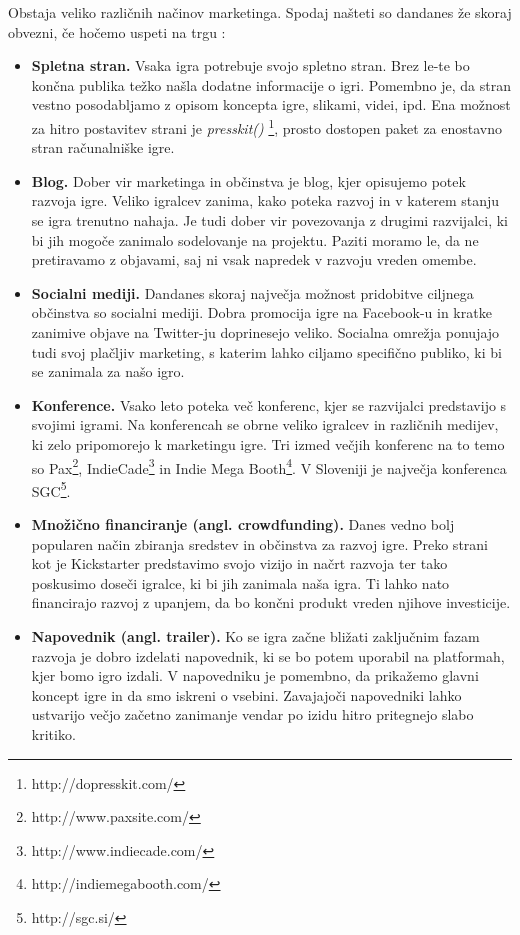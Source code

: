 \documentclass[12pt,a4paper,twoside]{book}
\begin{document}
Obstaja veliko različnih načinov marketinga. Spodaj našteti so dandanes že skoraj obvezni, če hočemo uspeti na trgu \cite{robertMarketing}:
\begin{itemize}
	\item \textbf{Spletna stran.} Vsaka igra potrebuje svojo spletno stran. Brez le-te bo končna publika težko našla dodatne informacije o igri. Pomembno je, da stran vestno posodabljamo z opisom koncepta igre, slikami, videi, ipd. Ena možnost za hitro postavitev strani je \textit{presskit()} \footnote{http://dopresskit.com/}, prosto dostopen paket za enostavno stran računalniške igre.
	\item \textbf{Blog.} Dober vir marketinga in občinstva je blog, kjer opisujemo potek razvoja igre. Veliko igralcev zanima, kako poteka razvoj in v katerem stanju se igra trenutno nahaja. Je tudi dober vir povezovanja z drugimi razvijalci, ki bi jih mogoče zanimalo sodelovanje na projektu. Paziti moramo le, da ne pretiravamo z objavami, saj ni vsak napredek v razvoju vreden omembe.
	\item \textbf{Socialni mediji.} Dandanes skoraj največja možnost pridobitve ciljnega občinstva so socialni mediji. Dobra promocija igre na Facebook-u in kratke zanimive objave na Twitter-ju doprinesejo veliko. Socialna omrežja ponujajo tudi svoj plačljiv marketing, s katerim lahko ciljamo specifično publiko, ki bi se zanimala za našo igro.
	\item \textbf{Konference.} Vsako leto poteka več konferenc, kjer se razvijalci predstavijo s svojimi igrami. Na konferencah	se obrne veliko igralcev in različnih medijev, ki zelo pripomorejo k marketingu igre. Tri izmed večjih konferenc na to temo so Pax\footnote{http://www.paxsite.com/}, IndieCade\footnote{http://www.indiecade.com/} in Indie Mega Booth\footnote{http://indiemegabooth.com/}. V Sloveniji je največja konferenca SGC\footnote{http://sgc.si/}.
	\item \textbf{Množično financiranje (angl. crowdfunding).} Danes vedno bolj popularen način zbiranja sredstev in občinstva za razvoj igre. Preko strani kot je Kickstarter predstavimo svojo vizijo in načrt razvoja ter tako poskusimo doseči igralce, ki bi jih zanimala naša igra. Ti lahko nato financirajo razvoj z upanjem, da bo končni produkt  vreden njihove investicije.
	\item \textbf{Napovednik (angl. trailer).} Ko se igra začne bližati zaključnim fazam razvoja je dobro izdelati napovednik, ki se bo potem uporabil na platformah, kjer bomo igro izdali. V napovedniku je pomembno, da prikažemo glavni koncept igre in da smo iskreni o vsebini. Zavajajoči napovedniki lahko ustvarijo večjo začetno zanimanje vendar po izidu hitro pritegnejo slabo kritiko.
\end{itemize}
\end{document}
